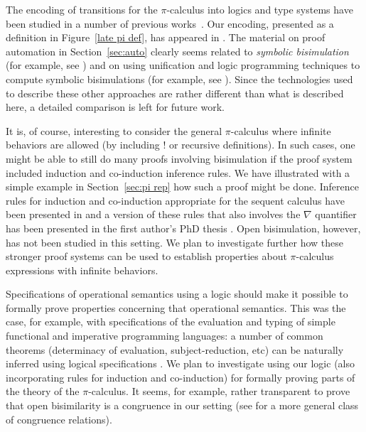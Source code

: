 \documentclass{acmtrans2m}
\begin{document}
The encoding of transitions for the $\pi$-calculus into logics and type
systems have been studied in a number of previous
works~\cite{honsell98,despeyroux00ifiptcs,honsell01tcs,roeckl01fossacs,bengtson07fossacs}.
Our encoding, presented as a definition in Figure~\ref{late pi def},
has appeared in \cite{miller99surveys,miller03lics}.  The material on
proof automation in Section~\ref{sec:auto} clearly seems related to
{\em symbolic bisimulation} (for example, see
\cite{hennessy95tcs,boreale96ic}) and on using unification and logic
programming techniques to compute symbolic bisimulations (for example,
see \cite{basu01iclp,boreale01icalp}).  Since the technologies used to
describe these other approaches are rather different than what is
described here, a detailed comparison is left for future work.

It is, of course, interesting to consider the general $\pi$-calculus
where infinite behaviors are allowed (by including $!$ or recursive
definitions).  In such cases, one might be able to still do many
proofs involving bisimulation if the proof system included induction
and co-induction inference rules. We have illustrated with a simple
example in Section~\ref{sec:pi rep} how such a proof might be done.
Inference rules for induction and co-induction appropriate for the 
sequent calculus have been presented 
in \cite{momigliano03types} and a version of these rules that also
involves the $\nabla$ quantifier has been presented in the first
author's PhD thesis \cite{tiu04phd}.  Open bisimulation, however, has not
been studied in this setting. We plan to investigate further how these
stronger proof systems can be used to establish properties about
$\pi$-calculus expressions with infinite behaviors.

Specifications of operational semantics using a logic should make
it possible to formally prove properties concerning that operational
semantics.  This was the case, for example, with specifications of the
evaluation and typing of simple functional and imperative programming
languages: a number of common theorems (determinacy of evaluation,
subject-reduction, etc) can be naturally inferred using logical
specifications \cite{mcdowell02tocl}.  We plan to investigate using
our logic (also incorporating rules for induction and
co-induction) for formally proving parts of the theory of the
$\pi$-calculus.  It seems, for example, rather transparent to prove
that open bisimilarity is a congruence in our setting (see
\cite{ziegler05sos} for a more general class of congruence relations).
\end{document}
